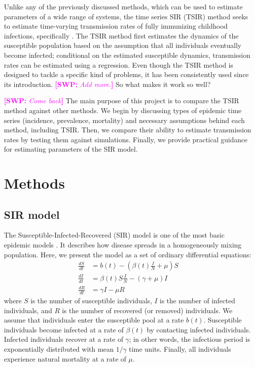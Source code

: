 \documentclass{article}
\newcommand{\comment}[3]{\textcolor{#1}{\textbf{[#2: }\textsl{#3}\textbf{]}}}
\newcommand{\swp}[1]{\comment{magenta}{SWP}{#1}}
\begin{document}
Unlike any of the previously discussed methods, which can be used to estimate parameters of a wide range of systems, the time series SIR (TSIR) method seeks to estimate time-varying transmission rates of fully immunizing childhood infections, specifically \citep{finkenstadt2000time}.
The TSIR method first estimates the dynamics of the susceptible population based on the assumption that all individuals eventually become infected;
conditional on the estimated susceptible dynamics, transmission rates can be estimated using a regression. 
Even though the TSIR method is designed to tackle a specific kind of problems, it has been consistently used since its introduction.
\swp{Add more.}
So what makes it work so well?

\swp{Come back}
The main purpose of this project is to compare the TSIR method against other methods.
We begin by discussing types of epidemic time series (incidence, prevalence, mortality) and necessary assumptions behind each method, including TSIR.
Then, we compare their ability to estimate transmission rates by testing them against simulations.
Finally, we provide practical guidance for estimating parameters of the SIR model.

\section{Methods}

\subsection{SIR model}

The Susceptible-Infected-Recovered (SIR) model is one of the most basic epidemic models \citep{kermack1927contribution}.
It describes how disease spreads in a homogeneously mixing population.
Here, we present the model as a set of ordinary differential equations:
\begin{equation}\label{eq:sir}
\begin{aligned}
\frac{dS}{dt} &= b(t) - \left(\beta(t) \frac{I}{N} + \mu \right) S\\
\frac{dI}{dt} &= \beta(t) S \frac{I}{N} - (\gamma + \mu) I\\
\frac{dR}{dt} &= \gamma I - \mu R
\end{aligned}
\end{equation}
where $S$ is the number of susceptible individuals, $I$ is the number of infected individuals, and $R$ is the number of recovered (or removed) individuals.
We assume that individuals enter the susceptible pool at a rate $b(t)$.
Susceptible individuals become infected at a rate of $\beta(t)$ by contacting infected individuals.
Infected individuals recover at a rate of $\gamma$;
in other words, the infectious period is exponentially distributed with mean $1/\gamma$ time units.
Finally, all individuals experience natural mortality at a rate of $\mu$.
\end{document}
